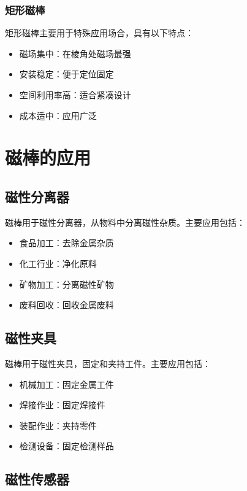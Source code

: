 \documentclass[12pt,UTF8]{ctexbook}
\begin{document}
\subsubsection{矩形磁棒}

矩形磁棒主要用于特殊应用场合，具有以下特点：

\begin{itemize}[leftmargin=2cm]
    \item 磁场集中：在棱角处磁场最强
    \item 安装稳定：便于定位固定
    \item 空间利用率高：适合紧凑设计
    \item 成本适中：应用广泛
\end{itemize}

\section{磁棒的应用}

\subsection{磁性分离器}

磁棒用于磁性分离器，从物料中分离磁性杂质。主要应用包括：

\begin{itemize}[leftmargin=2cm]
    \item 食品加工：去除金属杂质
    \item 化工行业：净化原料
    \item 矿物加工：分离磁性矿物
    \item 废料回收：回收金属废料
\end{itemize}

\subsection{磁性夹具}

磁棒用于磁性夹具，固定和夹持工件。主要应用包括：

\begin{itemize}[leftmargin=2cm]
    \item 机械加工：固定金属工件
    \item 焊接作业：固定焊接件
    \item 装配作业：夹持零件
    \item 检测设备：固定检测样品
\end{itemize}

\subsection{磁性传感器}
\end{document}
